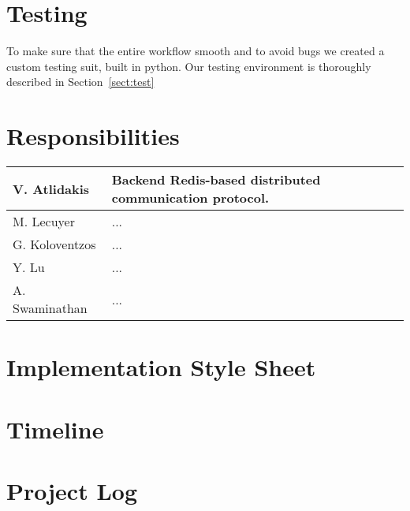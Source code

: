 \section{Testing}
To make sure that the entire workflow smooth and to avoid bugs we created a
custom testing suit, built in python. Our testing environment is thoroughly
described in Section~\ref{sect:test}


\section{Responsibilities}
\begin{center}
    \begin{tabular}{ | l || l |}
    \hline
    V. Atlidakis & Backend Redis-based distributed communication protocol.\\ \hline
    M. Lecuyer & ... \\ \hline
    G. Koloventzos & ... \\
    Y. Lu & ...  \\
    A. Swaminathan  &  ... \\
    \hline
    \end{tabular}
\end{center}

\section{Implementation Style Sheet}

\section{Timeline}


\section{Project Log}
